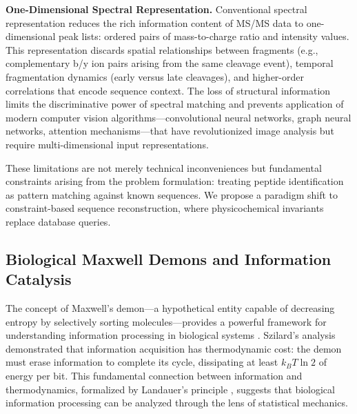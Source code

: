 \documentclass[11pt,twocolumn]{article}
\newcommand{\msms}{MS/MS}
\begin{document}
\textbf{One-Dimensional Spectral Representation.} Conventional spectral representation reduces the rich information content of \msms{} data to one-dimensional peak lists: ordered pairs of mass-to-charge ratio and intensity values. This representation discards spatial relationships between fragments (e.g., complementary b/y ion pairs arising from the same cleavage event), temporal fragmentation dynamics (early versus late cleavages), and higher-order correlations that encode sequence context. The loss of structural information limits the discriminative power of spectral matching and prevents application of modern computer vision algorithms---convolutional neural networks, graph neural networks, attention mechanisms---that have revolutionized image analysis but require multi-dimensional input representations.

These limitations are not merely technical inconveniences but fundamental constraints arising from the problem formulation: treating peptide identification as pattern matching against known sequences. We propose a paradigm shift to constraint-based sequence reconstruction, where physicochemical invariants replace database queries.

\subsection{Biological Maxwell Demons and Information Catalysis}

The concept of Maxwell's demon---a hypothetical entity capable of decreasing entropy by selectively sorting molecules---provides a powerful framework for understanding information processing in biological systems \cite{mizraji2021biological}. Szilard's analysis \cite{szilard1929entropy} demonstrated that information acquisition has thermodynamic cost: the demon must erase information to complete its cycle, dissipating at least $k_B T \ln 2$ of energy per bit. This fundamental connection between information and thermodynamics, formalized by Landauer's principle \cite{landauer1961irreversibility}, suggests that biological information processing can be analyzed through the lens of statistical mechanics.
\end{document}
